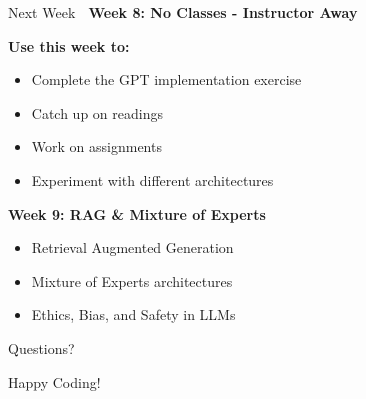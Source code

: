 \documentclass[aspectratio=169]{beamer}
\begin{document}
\begin{frame}[shrink=10]{Next Week 🔮}
    \textbf{Week 8: No Classes - Instructor Away}

    \vspace{0.5cm}

    \textbf{Use this week to:}
    \begin{itemize}\setlength{\itemsep}{0pt}
        \item Complete the GPT implementation exercise
        \item Catch up on readings
        \item Work on assignments
        \item Experiment with different architectures
    \end{itemize}

    \vspace{0.5cm}

    \textbf{Week 9: RAG \& Mixture of Experts}
    \begin{itemize}\setlength{\itemsep}{0pt}
        \item Retrieval Augmented Generation
        \item Mixture of Experts architectures
        \item Ethics, Bias, and Safety in LLMs
    \end{itemize}
\end{frame}

\begin{frame}
    \begin{center}
        \Huge{Questions? 💬}

        \vspace{2cm}

        \Large{Happy Coding! 🚀}
    \end{center}
\end{frame}
\end{document}
